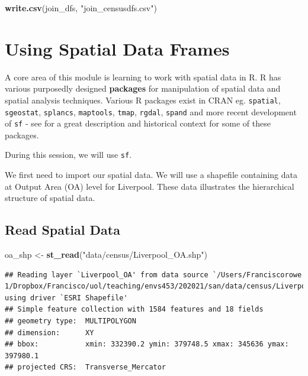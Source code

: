 \documentclass[
]{book}
\newenvironment{Shaded}{\begin{snugshade}}{\end{snugshade}}
\newcommand{\KeywordTok}[1]{\textcolor[rgb]{0.13,0.29,0.53}{\textbf{#1}}}
\newcommand{\NormalTok}[1]{#1}
\newcommand{\StringTok}[1]{\textcolor[rgb]{0.31,0.60,0.02}{#1}}
\begin{document}
\begin{Shaded}
\begin{Highlighting}[]
\KeywordTok{write.csv}\NormalTok{(join_dfs, }\StringTok{"join_censusdfs.csv"}\NormalTok{)}
\end{Highlighting}
\end{Shaded}

\hypertarget{using-spatial-data-frames}{%
\section{Using Spatial Data Frames}\label{using-spatial-data-frames}}

A core area of this module is learning to work with spatial data in R. R has various purposedly designed \textbf{packages} for manipulation of spatial data and spatial analysis techniques. Various R packages exist in CRAN eg. \texttt{spatial}, \texttt{sgeostat}, \texttt{splancs}, \texttt{maptools}, \texttt{tmap}, \texttt{rgdal}, \texttt{spand} and more recent development of \texttt{sf} - see \citet{Lovelace_et_al_2020_book} for a great description and historical context for some of these packages.

During this session, we will use \texttt{sf}.

We first need to import our spatial data. We will use a shapefile containing data at Output Area (OA) level for Liverpool. These data illustrates the hierarchical structure of spatial data.

\hypertarget{read-spatial-data}{%
\subsection{Read Spatial Data}\label{read-spatial-data}}

\begin{Shaded}
\begin{Highlighting}[]
\NormalTok{oa_shp <-}\StringTok{ }\KeywordTok{st_read}\NormalTok{(}\StringTok{"data/census/Liverpool_OA.shp"}\NormalTok{)}
\end{Highlighting}
\end{Shaded}

\begin{verbatim}
## Reading layer `Liverpool_OA' from data source `/Users/Franciscorowe 1/Dropbox/Francisco/uol/teaching/envs453/202021/san/data/census/Liverpool_OA.shp' using driver `ESRI Shapefile'
## Simple feature collection with 1584 features and 18 fields
## geometry type:  MULTIPOLYGON
## dimension:      XY
## bbox:           xmin: 332390.2 ymin: 379748.5 xmax: 345636 ymax: 397980.1
## projected CRS:  Transverse_Mercator
\end{verbatim}
\end{document}
